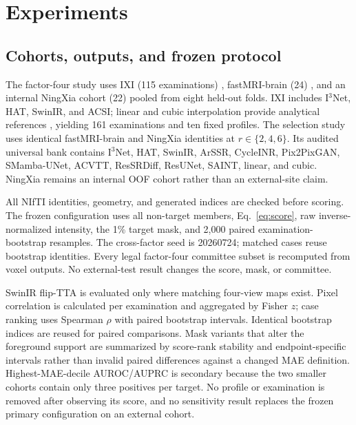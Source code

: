 \documentclass{article}
\begin{document}
\section{Experiments}
\subsection{Cohorts, outputs, and frozen protocol}
The factor-four study uses IXI (115 examinations) \cite{ixi}, fastMRI-brain (24) \cite{zbontar2018fastmri}, and an internal NingXia cohort (22) pooled from eight held-out folds. IXI includes I$^3$Net, HAT, SwinIR, and ACSI; linear and cubic interpolation provide analytical references \cite{keys1981cubic,thevenaz2000interpolation,unser1999splines}, yielding 161 examinations and ten fixed profiles. The selection study uses identical fastMRI-brain and NingXia identities at $r\in\{2,4,6\}$. Its audited universal bank contains I$^3$Net, HAT, SwinIR, ArSSR, CycleINR, Pix2PixGAN, SMamba-UNet, ACVTT, ResSRDiff, ResUNet, SAINT, linear, and cubic. NingXia remains an internal OOF cohort rather than an external-site claim.

\begin{table}[H]
 \centering
 \caption{Cohorts and stored neural outputs. Analytical references are available for every profile.}
 \resizebox{\columnwidth}{!}{}
 \label{tab:protocol}
\end{table}

All NIfTI identities, geometry, and generated indices are checked before scoring. The frozen configuration uses all non-target members, Eq.~\eqref{eq:score}, raw inverse-normalized intensity, the 1\% target mask, and 2,000 paired examination-bootstrap resamples. The cross-factor seed is 20260724; matched cases reuse bootstrap identities. Every legal factor-four committee subset is recomputed from voxel outputs. No external-test result changes the score, mask, or committee.

SwinIR flip-TTA is evaluated only where matching four-view maps exist. Pixel correlation is calculated per examination and aggregated by Fisher $z$; case ranking uses Spearman $\rho$ with paired bootstrap intervals. Identical bootstrap indices are reused for paired comparisons. Mask variants that alter the foreground support are summarized by score-rank stability and endpoint-specific intervals rather than invalid paired differences against a changed MAE definition. Highest-MAE-decile AUROC/AUPRC is secondary because the two smaller cohorts contain only three positives per target. No profile or examination is removed after observing its score, and no sensitivity result replaces the frozen primary configuration on an external cohort.
\end{document}
